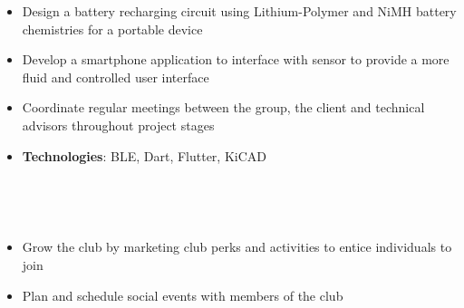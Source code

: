 \documentclass[10pt, letterpaper, ragged2e, withhyper]{altacv}
\begin{document}
\begin{paracol}{2}
    
    \begin{itemize}
        \item Design a battery recharging circuit using Lithium-Polymer and NiMH battery chemistries for a portable device 
        \item Develop a smartphone application to interface with sensor to provide a more fluid and 
        controlled user interface
        \item Coordinate regular meetings between the group, the client and technical advisors throughout project stages   
        \item \textbf{Technologies}: BLE, Dart, Flutter, KiCAD
    \end{itemize}






\switchcolumn

     \\
    
    \divider
    
    \\







    \begin{itemize}
        \item Grow the club by marketing club perks and activities to entice individuals to join
        \item Plan and schedule social events with members of the club
    \end{itemize}


\end{paracol}
\end{document}
